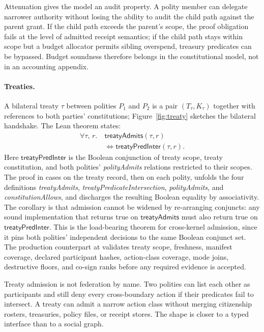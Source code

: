 Attenuation gives the model an audit property. A polity member can delegate narrower authority without losing the ability to audit the child path against the parent grant. If the child path exceeds the parent's scope, the proof obligation fails at the level of admitted receipt semantics; if the child path stays within scope but a budget allocator permits sibling overspend, treasury predicates can be bypassed. Budget soundness therefore belongs in the constitutional model, not in an accounting appendix.

\paragraph{Treaties.}
A bilateral treaty $\tau$ between polities $P_1$ and $P_2$ is a pair $(T_\tau,K_\tau)$ together with references to both parties' constitutions; Figure~\ref{fig:treaty} sketches the bilateral handshake. The Lean theorem  states:
\begin{equation*}
\begin{aligned}
\forall \tau,\, r.\ & \mathsf{treatyAdmits}(\tau,r) \\
  & \Leftrightarrow \mathsf{treatyPredInter}(\tau,r).
\end{aligned}
\end{equation*}
Here $\mathsf{treatyPredInter}$ is the Boolean conjunction of treaty scope, treaty constitution, and both polities' \emph{polityAdmits} relations restricted to their scopes. The proof in  cases on the treaty record, then on each polity, unfolds the four definitions \emph{treatyAdmits}, \emph{treatyPredicateIntersection}, \emph{polityAdmits}, and \emph{constitutionAllows}, and discharges the resulting Boolean equality by associativity. The corollary is that admission cannot be widened by re-arranging conjuncts: any sound implementation that returns true on $\mathsf{treatyAdmits}$ must also return true on $\mathsf{treatyPredInter}$. This is the load-bearing theorem for cross-kernel admission, since it pins both polities' independent decisions to the same Boolean conjunct set. The production counterpart at  validates treaty scope, freshness, manifest coverage, declared participant hashes, action-class coverage, mode joins, destructive floors, and co-sign ranks before any required evidence is accepted.

Treaty admission is not federation by name. Two polities can list each other as participants and still deny every cross-boundary action if their predicates fail to intersect. A treaty can admit a narrow action class without merging citizenship rosters, treasuries, policy files, or receipt stores. The shape is closer to a typed interface than to a social graph.

